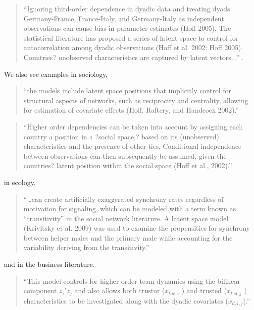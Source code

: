 \documentclass[11pt]{article}
\begin{document}
\begin{quote}
``Ignoring third-order dependence in dyadic data and treating dyads
  Germany-France, France-Italy, and Germany-Italy as independent
  observations can cause bias in parameter estimates (Hoff 2005). The
  statistical literature has proposed a series of latent space to
  control for autocorrelation among dyadic observations (Hoff et
  al. 2002; Hoff 2005). Countries? unobserved characteristics are
  captured by latent vectors...'' \citep[p. 17]{cao2016transnational}.
\end{quote}


\noindent We also see examples in sociology,

 \begin{quote} ``the models include latent space positions that implicitly control for structural aspects of networks, such as reciprocity and centrality, allowing for estimation of covariate effects (Hoff, Raftery, and Handcock 2002).'' \citep[p. 157]{spillane2017elephant}
 \end{quote}
 
 \begin{quote} ``Higher order dependencies can be taken into account by assigning each country a position in a ?social space,? based on its (unobserved) characteristics and the presence of other ties. Conditional independence between observations can then subsequently be assumed, given the countries? latent position within the social space (Hoff et al., 2002).'' \citep[p. 107]{berlusconi2017determinants}
 \end{quote}

\noindent in ecology,

\begin{quote}
``\ldots can create artificially exaggerated synchrony rates
  regardless of motivation for signaling, which can be modeled with a
  term known as ``transitivity'' in the social network literature. A
  latent space model (Krivitsky et al. 2009) was used to examine the
  propensities for synchrony between helper males and the primary male
  while accounting for the variability deriving from the
  transitivity.'' \citep[p. 989]{nomano2015unrelated}
\end{quote}
\noindent and in the business literature.


\begin{quote}
``This model controls for higher order team dynamics using the
  bilinear component $z_i'z_j$ and also allows both trustor
  ($x_{tor,i}$ ) and trusted ($x_{ted,j}$ ) characteristics to be
  investigated along with the dyadic covariates ($x_{d,i,j}$).'' \citep[p. 7]{dass2011impact}
\end{quote}
\end{document}
